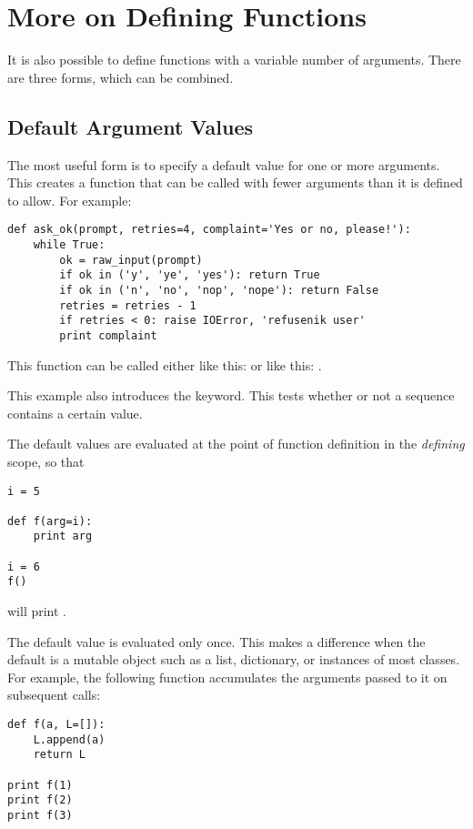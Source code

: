 \documentclass{manual}
\begin{document}
\section{More on Defining Functions \label{defining}}

It is also possible to define functions with a variable number of
arguments.  There are three forms, which can be combined.

\subsection{Default Argument Values \label{defaultArgs}}

The most useful form is to specify a default value for one or more
arguments.  This creates a function that can be called with fewer
arguments than it is defined to allow.  For example:

\begin{verbatim}
def ask_ok(prompt, retries=4, complaint='Yes or no, please!'):
    while True:
        ok = raw_input(prompt)
        if ok in ('y', 'ye', 'yes'): return True
        if ok in ('n', 'no', 'nop', 'nope'): return False
        retries = retries - 1
        if retries < 0: raise IOError, 'refusenik user'
        print complaint
\end{verbatim}

This function can be called either like this:
 or like this:
.

This example also introduces the  keyword. This tests
whether or not a sequence contains a certain value.

The default values are evaluated at the point of function definition
in the \emph{defining} scope, so that

\begin{verbatim}
i = 5

def f(arg=i):
    print arg

i = 6
f()
\end{verbatim}

will print .

  The default value is evaluated only once.
This makes a difference when the default is a mutable object such as a
list, dictionary, or instances of most classes.  For example, the
following function accumulates the arguments passed to it on
subsequent calls:

\begin{verbatim}
def f(a, L=[]):
    L.append(a)
    return L

print f(1)
print f(2)
print f(3)
\end{verbatim}
\end{document}
